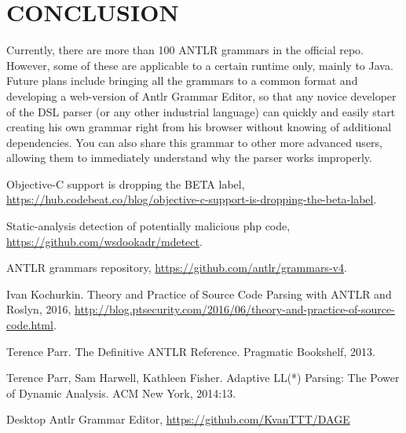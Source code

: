 \documentclass[a4paper, 10pt, conference]{ieeeconf}
\begin{document}
\section{CONCLUSION}

Currently, there are more than 100 ANTLR grammars in the official repo. However, some of these are applicable to a certain runtime only, mainly to Java. Future plans include bringing all the grammars to a common format and developing a web-version of Antlr Grammar Editor, so that any novice developer of the DSL parser (or any other industrial language) can quickly and easily start creating his own grammar right from his browser without knowing of additional dependencies. You can also share this grammar to other more advanced users, allowing them to immediately understand why the parser works improperly. 

\addtolength{\textheight}{-12cm}   %

\begin{thebibliography}{99}

 Objective-C support is dropping the BETA label, \url{https://hub.codebeat.co/blog/objective-c-support-is-dropping-the-beta-label}.

 Static-analysis detection of potentially malicious php code, \url{https://github.com/wsdookadr/mdetect}.

 ANTLR grammars repository, \url{https://github.com/antlr/grammars-v4}.

 Ivan Kochurkin. Theory and Practice of Source Code Parsing with ANTLR and Roslyn, 2016, \url{http://blog.ptsecurity.com/2016/06/theory-and-practice-of-source-code.html}.

 Terence Parr. The Definitive ANTLR Reference. Pragmatic Bookshelf, 2013.

 Terence Parr, Sam Harwell, Kathleen Fisher. Adaptive LL(*) Parsing: The Power of Dynamic Analysis. ACM New York, 2014:13.

 Desktop Antlr Grammar Editor, \url{https://github.com/KvanTTT/DAGE}

\end{thebibliography}
\end{document}
